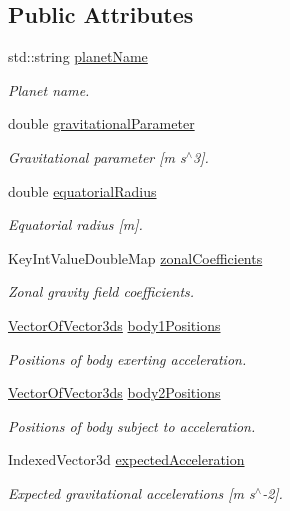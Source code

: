 \subsection*{Public Attributes}
\begin{DoxyCompactItemize}
\item 
std\+::string \hyperlink{structtudat_1_1unit__tests_1_1PlanetTestData_a965d857e9cf3fece2fd54f555fb29c47}{planet\+Name}
\begin{DoxyCompactList}\small\item\em Planet name. \end{DoxyCompactList}\item 
double \hyperlink{structtudat_1_1unit__tests_1_1PlanetTestData_a11fb9d4b33ce68a46380392cc81839ad}{gravitational\+Parameter}
\begin{DoxyCompactList}\small\item\em Gravitational parameter \mbox{[}m s$^\wedge$3\mbox{]}. \end{DoxyCompactList}\item 
double \hyperlink{structtudat_1_1unit__tests_1_1PlanetTestData_a3c4fec8841ffc942e797d9f9904719b3}{equatorial\+Radius}
\begin{DoxyCompactList}\small\item\em Equatorial radius \mbox{[}m\mbox{]}. \end{DoxyCompactList}\item 
Key\+Int\+Value\+Double\+Map \hyperlink{structtudat_1_1unit__tests_1_1PlanetTestData_aefcb3b33844b59812d284e741c6602ab}{zonal\+Coefficients}
\begin{DoxyCompactList}\small\item\em Zonal gravity field coefficients. \end{DoxyCompactList}\item 
\hyperlink{structtudat_1_1unit__tests_1_1PlanetTestData_a8c5d3fe2116951da135781145becea40}{Vector\+Of\+Vector3ds} \hyperlink{structtudat_1_1unit__tests_1_1PlanetTestData_ab5a35deb6d7ffb8802b21240014c4e5a}{body1\+Positions}
\begin{DoxyCompactList}\small\item\em Positions of body exerting acceleration. \end{DoxyCompactList}\item 
\hyperlink{structtudat_1_1unit__tests_1_1PlanetTestData_a8c5d3fe2116951da135781145becea40}{Vector\+Of\+Vector3ds} \hyperlink{structtudat_1_1unit__tests_1_1PlanetTestData_a148b840cb4f45b9c3499a7f3d1bf193d}{body2\+Positions}
\begin{DoxyCompactList}\small\item\em Positions of body subject to acceleration. \end{DoxyCompactList}\item 
Indexed\+Vector3d \hyperlink{structtudat_1_1unit__tests_1_1PlanetTestData_a573ed4ab5516514b60d9da01a1d097f3}{expected\+Acceleration}
\begin{DoxyCompactList}\small\item\em Expected gravitational accelerations \mbox{[}m s$^\wedge$-\/2\mbox{]}. \end{DoxyCompactList}\end{DoxyCompactItemize}



